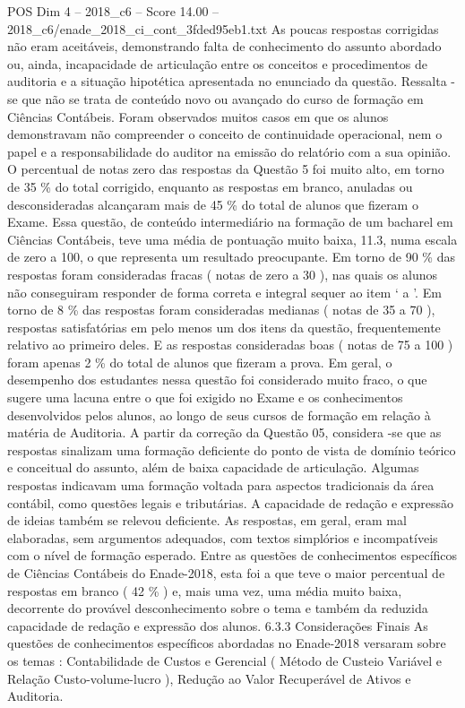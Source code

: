\begin{textsample}{POS Dim 4 – 2018\_c6 – Score 14.00 – 2018\_c6/enade\_2018\_ci\_cont\_3fded95eb1.txt}
As poucas respostas corrigidas não eram aceitáveis, demonstrando falta de conhecimento do assunto abordado ou, ainda, incapacidade de articulação entre os conceitos e procedimentos de auditoria e a situação hipotética apresentada no enunciado da questão.
Ressalta -se que não se trata de conteúdo novo ou avançado do curso de formação em Ciências Contábeis.
Foram observados muitos casos em que os alunos demonstravam não compreender o conceito de continuidade operacional, nem o papel e a responsabilidade do auditor na emissão do relatório com a sua opinião.
O percentual de notas zero das respostas da Questão 5 foi muito alto, em torno de 35 \% do total corrigido, enquanto as respostas em branco, anuladas ou desconsideradas alcançaram mais de 45 \% do total de alunos que fizeram o Exame.
Essa questão, de conteúdo intermediário na formação de um bacharel em Ciências Contábeis, teve uma média de pontuação muito baixa, 11.3, numa escala de zero a 100, o que representa um resultado preocupante.
Em torno de 90 \% das respostas foram consideradas fracas ( notas de zero a 30 ), nas quais os alunos não conseguiram responder de forma correta e integral sequer ao item ‘ a ’.
Em torno de 8 \% das respostas foram consideradas medianas ( notas de 35 a 70 ), respostas satisfatórias em pelo menos um dos itens da questão, frequentemente relativo ao primeiro deles.
E as respostas consideradas boas ( notas de 75 a 100 ) foram apenas 2 \% do total de alunos que fizeram a prova.
Em geral, o desempenho dos estudantes nessa questão foi considerado muito fraco, o que sugere uma lacuna entre o que foi exigido no Exame e os conhecimentos desenvolvidos pelos alunos, ao longo de seus cursos de formação em relação à matéria de Auditoria.
A partir da correção da Questão 05, considera -se que as respostas sinalizam uma formação deficiente do ponto de vista de domínio teórico e conceitual do assunto, além de baixa capacidade de articulação.
Algumas respostas indicavam uma formação voltada para aspectos tradicionais da área contábil, como questões legais e tributárias.
A capacidade de redação e expressão de ideias também se relevou deficiente.
As respostas, em geral, eram mal elaboradas, sem argumentos adequados, com textos simplórios e incompatíveis com o nível de formação esperado.
Entre as questões de conhecimentos específicos de Ciências Contábeis do Enade-2018, esta foi a que teve o maior percentual de respostas em branco ( 42 \% ) e, mais uma vez, uma média muito baixa, decorrente do provável desconhecimento sobre o tema e também da reduzida capacidade de redação e expressão dos alunos. 6.3.3 Considerações Finais As questões de conhecimentos específicos abordadas no Enade-2018 versaram sobre os temas : Contabilidade de Custos e Gerencial ( Método de Custeio Variável e Relação Custo-volume-lucro ), Redução ao Valor Recuperável de Ativos e Auditoria.

\end{textsample}
